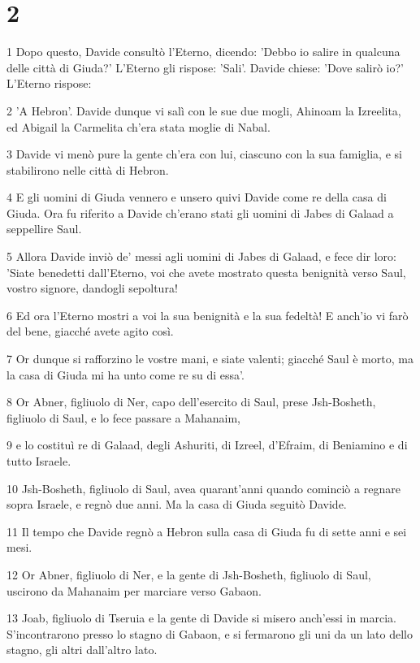 \chapter{2}

\par 1 Dopo questo, Davide consultò l'Eterno, dicendo: 'Debbo io salire in qualcuna delle città di Giuda?' L'Eterno gli rispose: 'Sali'. Davide chiese: 'Dove salirò io?' L'Eterno rispose:
\par 2 'A Hebron'. Davide dunque vi salì con le sue due mogli, Ahinoam la Izreelita, ed Abigail la Carmelita ch'era stata moglie di Nabal.
\par 3 Davide vi menò pure la gente ch'era con lui, ciascuno con la sua famiglia, e si stabilirono nelle città di Hebron.
\par 4 E gli uomini di Giuda vennero e unsero quivi Davide come re della casa di Giuda. Ora fu riferito a Davide ch'erano stati gli uomini di Jabes di Galaad a seppellire Saul.
\par 5 Allora Davide inviò de' messi agli uomini di Jabes di Galaad, e fece dir loro: 'Siate benedetti dall'Eterno, voi che avete mostrato questa benignità verso Saul, vostro signore, dandogli sepoltura!
\par 6 Ed ora l'Eterno mostri a voi la sua benignità e la sua fedeltà! E anch'io vi farò del bene, giacché avete agito così.
\par 7 Or dunque si rafforzino le vostre mani, e siate valenti; giacché Saul è morto, ma la casa di Giuda mi ha unto come re su di essa'.
\par 8 Or Abner, figliuolo di Ner, capo dell'esercito di Saul, prese Jsh-Bosheth, figliuolo di Saul, e lo fece passare a Mahanaim,
\par 9 e lo costituì re di Galaad, degli Ashuriti, di Izreel, d'Efraim, di Beniamino e di tutto Israele.
\par 10 Jsh-Bosheth, figliuolo di Saul, avea quarant'anni quando cominciò a regnare sopra Israele, e regnò due anni. Ma la casa di Giuda seguitò Davide.
\par 11 Il tempo che Davide regnò a Hebron sulla casa di Giuda fu di sette anni e sei mesi.
\par 12 Or Abner, figliuolo di Ner, e la gente di Jsh-Bosheth, figliuolo di Saul, uscirono da Mahanaim per marciare verso Gabaon.
\par 13 Joab, figliuolo di Tseruia e la gente di Davide si misero anch'essi in marcia. S'incontrarono presso lo stagno di Gabaon, e si fermarono gli uni da un lato dello stagno, gli altri dall'altro lato.
